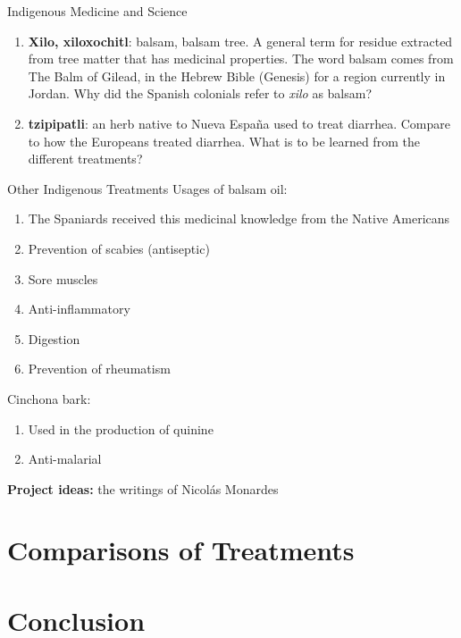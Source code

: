 \documentclass{beamer}
\begin{document}
\begin{frame}{Indigenous Medicine and Science}
\small
\begin{enumerate}
\item \textbf{Xilo, xiloxochitl}: balsam, balsam tree.  A general term for residue extracted from tree matter that has medicinal properties.  The word balsam comes from The Balm of Gilead, in the Hebrew Bible (Genesis) for a region currently in Jordan.  Why did the Spanish colonials refer to \textit{xilo} as balsam?
\item \textbf{tzipipatli}: an herb native to Nueva Espa\~{n}a used to treat diarrhea.  Compare to how the Europeans treated diarrhea.  What is to be learned from the different treatments?
\end{enumerate}
\end{frame}

\begin{frame}{Other Indigenous Treatments}
Usages of balsam oil:
\begin{enumerate}
\item The Spaniards received this medicinal knowledge from the Native Americans
\item Prevention of scabies (antiseptic)
\item Sore muscles
\item Anti-inflammatory
\item Digestion
\item Prevention of rheumatism
\end{enumerate}
Cinchona bark:
\begin{enumerate}
\item Used in the production of quinine
\item Anti-malarial
\end{enumerate}
\textbf{Project ideas:} the writings of Nicol\'{a}s Monardes
\end{frame}

\section{Comparisons of Treatments}

\section{Conclusion}
\end{document}
